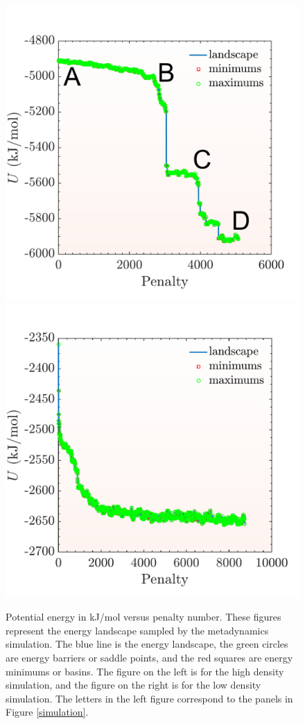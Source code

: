 \begin{figure}[h]
	\centering
	\includegraphics[width = .45\textwidth]{./Figures/Nucleation/high_density/landscape.pdf}
	\hspace{.03\textwidth}
	\includegraphics[width = .45\textwidth]{./Figures/Nucleation/low_density/landscape.pdf}
	\caption{Potential energy in kJ/mol versus penalty number.  These figures represent the energy landscape sampled by the metadynamics simulation.  The blue line is the energy landscape, the green circles are energy barriers or saddle points, and the red squares are energy minimums or basins.  The figure on the left is for the high density simulation, and the figure on the right is for the low density simulation.  The letters in the left figure correspond to the panels in Figure \ref{simulation}.}
	\label{landscapes}
\end{figure}

